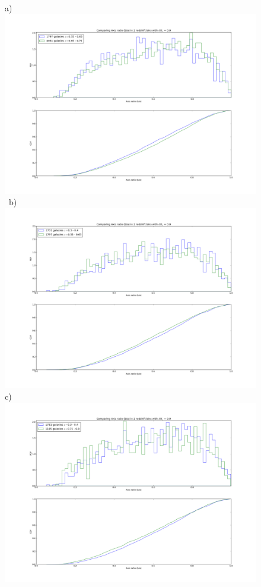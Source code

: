 \documentclass[twocolumn,useAMS,usenatbib]{mn2e}
\begin{document}
\begin{figure}
 \centering
 a) \includegraphics[width=0.9\columnwidth]{axisratio(0)_0dot55-0dot65_0dot65-0dot75.png} \
 b) \includegraphics[width=0.9\columnwidth]{axisratio(0)_0dot3-0dot4_0dot55-0dot65.png} \\
 c) \includegraphics[width=0.9\columnwidth]{axisratio(0)_0dot3-0dot4_0dot75-0dot8.png} \

\end{figure}
\end{document}
